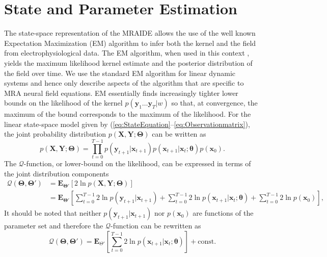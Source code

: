 \documentclass[11pt,draftcls,onecolumn,peerreview]{IEEEtran}
\begin{document}
\section{State and Parameter Estimation}
The state-space representation of the MRAIDE allows the use of the well known Expectation Maximization (EM) algorithm \cite{Dempster1977} to infer both the kernel and the field from electrophysiological data. The EM algorithm, when used in this context \cite{Dewar2009}, yields the maximum likelihood kernel estimate and the posterior distribution of the field over time. We use the standard EM algorithm for linear dynamic systems \cite{Shumway2000} and hence only describe aspects of the algorithm that are specific to MRA neural field equations. EM essentially finds increasingly tighter lower bounds on the likelihood of the kernel $p(\mathbf{y}_1 \ldots \mathbf{y}_T|w)$ so that, at convergence, the maximum of the bound corresponds to the maximum of the likelihood. 
For the linear state-space model given by (\ref{eq:StateEquation}--\ref{eq:Observationmatrix}), the joint probability distribution $p(\mathbf X,\mathbf Y;\boldsymbol \Theta)$ can be written as
 \begin{equation}\label{eq:jointdistribution}
  p(\mathbf X,\mathbf Y;\boldsymbol \Theta)=\prod_{t=0}^{T-1} p(\mathbf y_{t+1}|\mathbf x_{t+1})p(\mathbf x_{t+1}|\mathbf x_{t};\boldsymbol \theta)p(\mathbf x_0).
 \end{equation}
 The $\mathcal Q$-function, or lower-bound on the likelihood, can be expressed in terms of the joint distribution components
 \begin{align}
  \mathcal Q(\boldsymbol \Theta,\boldsymbol\Theta')&=\mathbf E_{\boldsymbol \Theta'}\left[2\ln p(\mathbf X,\mathbf Y;\boldsymbol \Theta)\right] \nonumber \\
 &=\mathbf E_{\boldsymbol\Theta'}\left[\sum_{t=0}^{T-1}2\ln p(\mathbf y_{t+1}|\mathbf x_{t+1})+\sum_{t=0}^{T-1}2\ln p(\mathbf x_{t+1}|\mathbf x_{t};\boldsymbol \theta)
 +\sum_{t=0}^{T-1}2\ln p(\mathbf x_0)\right],
 \end{align}
It should be noted that neither $p(\mathbf y_{t+1}|\mathbf x_{t+1})$ nor $p(\mathbf x_0)$ are functions of the parameter set and therefore the $\mathcal Q$-function can be rewritten as
\begin{equation}
\mathcal Q(\boldsymbol \Theta,\boldsymbol\Theta')=\mathbf E_{\Theta'}\left[\sum_{t=0}^{T-1}2\ln p(\mathbf x_{t+1}|\mathbf x_{t};\boldsymbol \theta)\right]+\mathrm{const.}
\end{equation}
\end{document}
